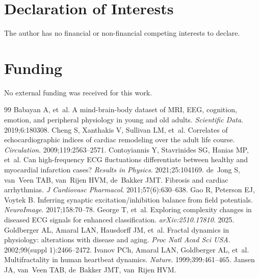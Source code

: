 \documentclass[11pt,a4paper]{article}
\begin{document}
\section*{Declaration of Interests}
The author has no financial or non-financial competing interests to declare.
\section*{Funding}
No external funding was received for this work.

\begin{thebibliography}{99}
Babayan A, et~al.
\newblock A mind-brain-body dataset of MRI, EEG, cognition, emotion, and peripheral physiology in young and old adults.
\newblock \textit{Scientific Data}. 2019;6:180308.
Cheng S, Xanthakis V, Sullivan LM, et~al.
\newblock Correlates of echocardiographic indices of cardiac remodeling over the adult life course.
\newblock \textit{Circulation}. 2009;119:2563--2571.
Contoyiannis Y, Stavrinides SG, Hanias MP, et~al.
\newblock Can high-frequency ECG fluctuations differentiate between healthy and myocardial infarction cases?
\newblock \textit{Results in Physics}. 2021;25:104169.
de~Jong S, van~Veen TAB, van~Rijen HVM, de~Bakker JMT.
\newblock Fibrosis and cardiac arrhythmias.
\newblock \textit{J Cardiovasc Pharmacol}. 2011;57(6):630--638.
Gao R, Peterson EJ, Voytek B.
\newblock Inferring synaptic excitation/inhibition balance from field potentials.
\newblock \textit{NeuroImage}. 2017;158:70--78.
George T, et~al.
\newblock Exploring complexity changes in diseased ECG signals for enhanced classification.
\newblock \textit{arXiv:2510.17810}. 2025.
Goldberger AL, Amaral LAN, Hausdorff JM, et~al.
\newblock Fractal dynamics in physiology: alterations with disease and aging.
\newblock \textit{Proc Natl Acad Sci USA}. 2002;99(suppl 1):2466--2472.
Ivanov PCh, Amaral LAN, Goldberger AL, et~al.
\newblock Multifractality in human heartbeat dynamics.
\newblock \textit{Nature}. 1999;399:461--465.
Jansen JA, van~Veen TAB, de~Bakker JMT, van~Rijen HVM.

\end{thebibliography}
\end{document}
